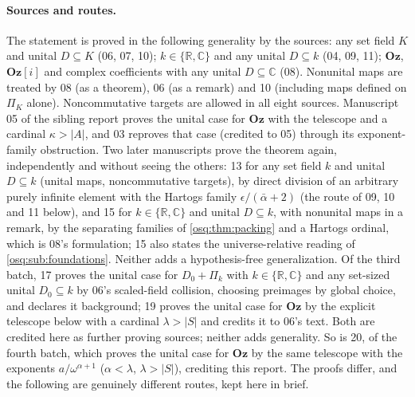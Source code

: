 \documentclass[11pt,letterpaper]{article}
\numberwithin{equation}{section}
\theoremstyle{definition}
\theoremstyle{remark}
\theoremstyle{plain}
\newcommand{\Oz}{\mathbf{Oz}}
\newcommand{\GOz}{\Oz[i]}
\newcommand{\R}{\mathbb R}
\newcommand{\C}{\mathbb C}
\begin{document}
\paragraph{Sources and routes.} The statement is proved in the following generality by the
sources: any set field $K$ and unital $D\subseteq K$ (06, 07, 10); $k\in\{\R,\C\}$ and any
unital $D\subseteq k$ (04, 09, 11); $\Oz$, $\GOz$ and complex coefficients with any unital
$D\subseteq\C$ (08). Nonunital maps are treated by 08 (as a theorem), 06 (as a remark)
and 10 (including maps defined on $\Pi_K$ alone). Noncommutative targets are allowed in
all eight sources. Manuscript 05 of the sibling report \cite{RepoOdg} proves the unital
case for $\Oz$ with the telescope and a cardinal $\kappa>|A|$, and 03 reproves that case
(credited to 05) through its exponent-family obstruction. Two later manuscripts prove the theorem
again, independently and without seeing the others: 13 for any set field $k$ and unital
$D\subseteq k$ (unital maps, noncommutative targets), by direct division of an arbitrary purely infinite
element with the Hartogs family $\epsilon/(\bar\alpha+2)$ (the route of 09, 10 and 11 below), and 15 for
$k\in\{\R,\C\}$ and unital $D\subseteq k$, with nonunital maps in a remark, by the separating families of
\cref{osq:thm:packing} and a Hartogs ordinal, which is 08's formulation; 15 also states the universe-relative
reading of \cref{osq:sub:foundations}. Neither adds a hypothesis-free generalization. Of the third batch, 17 proves
the unital case for $D_0+\Pi_k$ with $k\in\{\R,\C\}$ and any set-sized unital $D_0\subseteq k$ by 06's scaled-field
collision, choosing preimages by global choice, and declares it background; 19 proves the unital case for $\Oz$ by the
explicit telescope below with a cardinal $\lambda>|S|$ and credits it to 06's text. Both are credited here as further
proving sources; neither adds generality. So is 20, of the fourth batch, which proves the unital case for $\Oz$ by the same
telescope with the exponents $a/\omega^{\alpha+1}$ ($\alpha<\lambda$, $\lambda>|S|$), crediting this report. The proofs differ, and the
following are genuinely different routes, kept here in brief.
\end{document}
